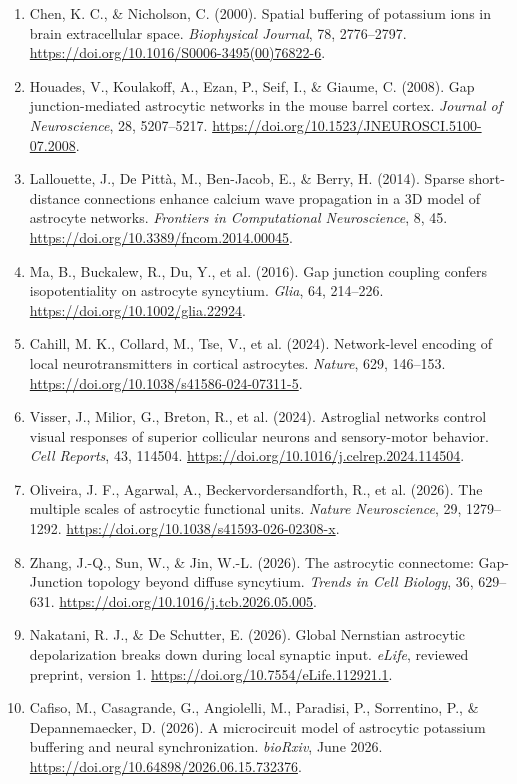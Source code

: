 \documentclass[
  11pt,
]{article}
\begin{document}
\begin{enumerate}
\item
  Chen, K. C., \& Nicholson, C. (2000). Spatial buffering of potassium ions in brain extracellular space. \emph{Biophysical Journal}, 78, 2776--2797. \url{https://doi.org/10.1016/S0006-3495(00)76822-6}.
\item
  Houades, V., Koulakoff, A., Ezan, P., Seif, I., \& Giaume, C. (2008). Gap junction-mediated astrocytic networks in the mouse barrel cortex. \emph{Journal of Neuroscience}, 28, 5207--5217. \url{https://doi.org/10.1523/JNEUROSCI.5100-07.2008}.
\item
  Lallouette, J., De Pittà, M., Ben-Jacob, E., \& Berry, H. (2014). Sparse short-distance connections enhance calcium wave propagation in a 3D model of astrocyte networks. \emph{Frontiers in Computational Neuroscience}, 8, 45. \url{https://doi.org/10.3389/fncom.2014.00045}.
\item
  Ma, B., Buckalew, R., Du, Y., et al. (2016). Gap junction coupling confers isopotentiality on astrocyte syncytium. \emph{Glia}, 64, 214--226. \url{https://doi.org/10.1002/glia.22924}.
\item
  Cahill, M. K., Collard, M., Tse, V., et al. (2024). Network-level encoding of local neurotransmitters in cortical astrocytes. \emph{Nature}, 629, 146--153. \url{https://doi.org/10.1038/s41586-024-07311-5}.
\item
  Visser, J., Milior, G., Breton, R., et al. (2024). Astroglial networks control visual responses of superior collicular neurons and sensory-motor behavior. \emph{Cell Reports}, 43, 114504. \url{https://doi.org/10.1016/j.celrep.2024.114504}.
\item
  Oliveira, J. F., Agarwal, A., Beckervordersandforth, R., et al. (2026). The multiple scales of astrocytic functional units. \emph{Nature Neuroscience}, 29, 1279--1292. \url{https://doi.org/10.1038/s41593-026-02308-x}.
\item
  Zhang, J.-Q., Sun, W., \& Jin, W.-L. (2026). The astrocytic connectome: Gap-Junction topology beyond diffuse syncytium. \emph{Trends in Cell Biology}, 36, 629--631. \url{https://doi.org/10.1016/j.tcb.2026.05.005}.
\item
  Nakatani, R. J., \& De Schutter, E. (2026). Global Nernstian astrocytic depolarization breaks down during local synaptic input. \emph{eLife}, reviewed preprint, version 1. \url{https://doi.org/10.7554/eLife.112921.1}.
\item
  Cafiso, M., Casagrande, G., Angiolelli, M., Paradisi, P., Sorrentino, P., \& Depannemaecker, D. (2026). A microcircuit model of astrocytic potassium buffering and neural synchronization. \emph{bioRxiv}, June 2026. \url{https://doi.org/10.64898/2026.06.15.732376}.
\end{enumerate}
\end{document}

